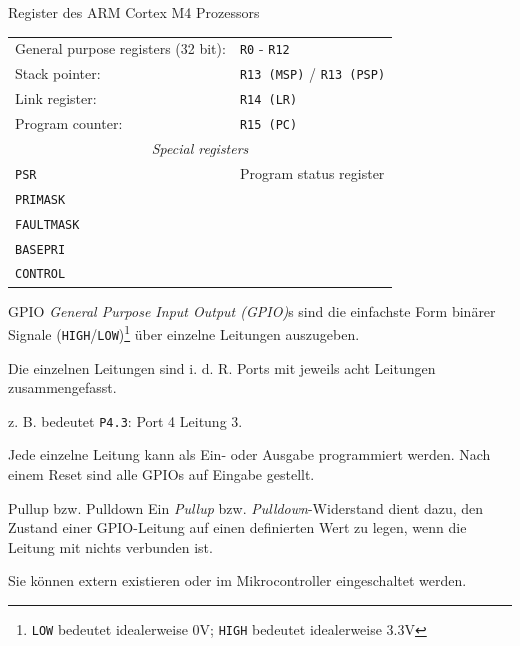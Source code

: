 \begin{defi}{Register des ARM Cortex M4 Prozessors}
    \begin{tabular}{ll}
        General purpose registers (32 bit): & \texttt{R0} - \texttt{R12}              \\
        Stack pointer:                      & \texttt{R13 (MSP)} / \texttt{R13 (PSP)} \\
        Link register:                      & \texttt{R14 (LR)}                       \\
        Program counter:                    & \texttt{R15 (PC)}                       \\
        \multicolumn{2}{c}{\emph{Special registers}}                                  \\
        \texttt{PSR}                        & Program status register                 \\
        \texttt{PRIMASK}                    &                                         \\
        \texttt{FAULTMASK}                  &                                         \\
        \texttt{BASEPRI}                    &                                         \\
        \texttt{CONTROL}                    &                                         \\
    \end{tabular}
\end{defi}

\begin{defi}{GPIO}
    \emph{General Purpose Input Output (GPIO)}s sind die einfachste Form binärer Signale (\texttt{HIGH}/\texttt{LOW})\footnote{\texttt{LOW} bedeutet idealerweise 0V; \texttt{HIGH} bedeutet idealerweise 3.3V} über einzelne Leitungen auszugeben.

    Die einzelnen Leitungen sind i. d. R. Ports mit jeweils acht Leitungen zusammengefasst.

    z. B. bedeutet \texttt{P4.3}: Port 4 Leitung 3.

    Jede einzelne Leitung kann als Ein- oder Ausgabe programmiert werden.
    Nach einem Reset sind alle GPIOs auf Eingabe gestellt.
\end{defi}

\begin{bonus}{Pullup bzw. Pulldown}
    Ein \emph{Pullup} bzw. \emph{Pulldown}-Widerstand dient dazu, den Zustand einer GPIO-Leitung auf einen definierten Wert zu legen, wenn die Leitung mit nichts verbunden ist.

    Sie können extern existieren oder im Mikrocontroller eingeschaltet werden.
\end{bonus}